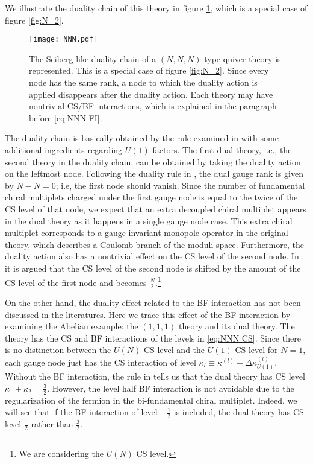 \documentclass[a4paper,11pt]{article}
\begin{document}
We illustrate the duality chain of this theory in figure \ref{fig:NNN}, which is a special case of figure \ref{fig:N=2}.
%
\begin{figure}[tbp]
\centering %
\texttt{[image: NNN.pdf]}
\caption{\label{fig:NNN} The Seiberg-like duality chain of a $(N,N,N)$-type quiver theory is represented. This is a special case of figure \ref{fig:N=2}. Since every node has the same rank, a node to which the duality action is applied disappears after the duality action. Each theory may have nontrivial CS/BF interactions, which is explained in the paragraph before \eqref{eq:NNN FI}.}
\end{figure}
%
The duality chain is basically obtained by the rule examined in \cite{Aharony:1997gp,Benini:2011mf} with some additional ingredients regarding $U(1)$ factors. The first dual theory, i.e., the second theory in the duality chain, can be obtained by taking the duality action on the leftmost node. Following the duality rule in \cite{Aharony:1997gp,Benini:2011mf}, the dual gauge rank is given by $N-N = 0$; i.e, the first node should vanish. Since the number of fundamental chiral multiplets charged under the first gauge node is equal to the twice of the CS level of that node, we expect that an extra decoupled chiral multiplet appears in the dual theory as it happens in a single gauge node case. This extra chiral multiplet corresponds to a gauge invariant monopole operator in the original theory, which describes a Coulomb branch of the moduli space. Furthermore, the duality action also has a nontrivial effect on the CS level of the second node. In \cite{Benini:2011mf}, it is argued that the CS level of the second node is shifted by the amount of the CS level of the first node and becomes $\frac{N}{2}$.\footnote{We are considering the $U(N)$ CS level.}

On the other hand, the duality effect related to the BF interaction has not been discussed in the literatures. Here we trace this effect of the BF interaction by examining the Abelian example: the $(1,1,1)$ theory and its dual theory. The theory has the CS and BF interactions of the levels in \eqref{eq:NNN CS}. Since there is no distinction between the $U(N)$ CS level and the $U(1)$ CS level for $N = 1$, each gauge node just has the CS interaction of level $\kappa_l \equiv \kappa^{(l)}+\Delta \kappa_{U(1)}^{(l)}$. Without the BF interaction, the rule in \cite{Benini:2011mf} tells us that the dual theory has CS level $\kappa_1+\kappa_2 = \frac{3}{2}$. However, the level half BF interaction is not avoidable due to the regularization of the fermion in the bi-fundamental chiral multiplet. Indeed, we will see that if the BF interaction of level $-\frac{1}{2}$ is included, the dual theory has CS level $\frac{1}{2}$ rather than $\frac{3}{2}$.
\\
\end{document}
